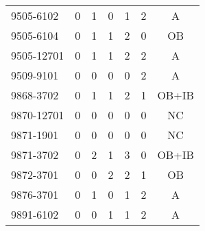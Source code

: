 \begin{longtable}[c]{lcccccc}
9505-6102 & 0 & 1 & 0 & 1 & 2 & A \\
9505-6104 & 0 & 1 & 1 & 2 & 0 & OB \\
9505-12701 & 0 & 1 & 1 & 2 & 2 & A \\
9509-9101 & 0 & 0 & 0 & 0 & 2 & A \\
9868-3702 & 0 & 1 & 1 & 2 & 1 & OB+IB \\
9870-12701 & 0 & 0 & 0 & 0 & 0 & NC \\
9871-1901 & 0 & 0 & 0 & 0 & 0 & NC \\
9871-3702 & 0 & 2 & 1 & 3 & 0 & OB+IB \\
9872-3701 & 0 & 0 & 2 & 2 & 1 & OB \\
9876-3701 & 0 & 1 & 0 & 1 & 2 & A \\
9891-6102 & 0 & 0 & 1 & 1 & 2 & A
\end{longtable}